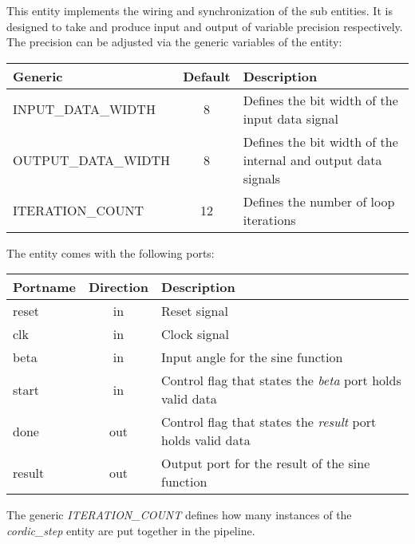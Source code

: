 This entity implements the wiring and synchronization of the sub entities. It is designed to take and produce input and output of variable precision respectively. The precision can be adjusted via the generic variables of the entity:

\begin{center}
	\begin{tabular}{ | l | c | l | }
		\hline
		\textbf{Generic} & \textbf{Default} & \textbf{Description} \\
		\hline
		INPUT\_DATA\_WIDTH & 8 & Defines the bit width of the input data signal \\
		OUTPUT\_DATA\_WIDTH & 8 & Defines the bit width of the internal and output data signals \\
		ITERATION\_COUNT & 12 & Defines the number of loop iterations \\
		\hline
	\end{tabular} 
\end{center}

The entity comes with the following ports:

\begin{center}
	\begin{tabular}{ | l | c | l | }
		\hline
		\textbf{Portname} & \textbf{Direction} & \textbf{Description} \\
		\hline
		reset & in & Reset signal \\
		clk & in  & Clock signal \\
		beta & in  & Input angle for the sine function \\
		start & in & Control flag that states the \textit{beta} port holds valid data \\
		done & out & Control flag that states the \textit{result} port holds valid data \\
		result & out & Output port for the result of the sine function \\
		\hline
	\end{tabular} 
\end{center}

The generic \textit{ITERATION\_COUNT} defines how many instances of the \textit{cordic\_step} entity are put together in the pipeline. 
